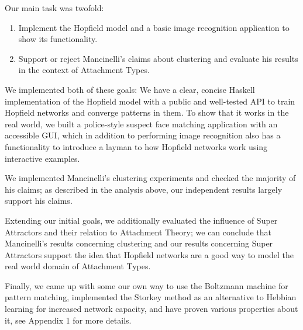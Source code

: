 Our main task was twofold:

\begin{enumerate}
\item Implement the Hopfield model and a basic image recognition application to show its functionality.
\item Support or reject Mancinelli's claims about clustering and evaluate his results in the context of Attachment Types.
\end{enumerate}

We implemented both of these goals: We have a clear, concise Haskell implementation of the Hopfield model with a public and well-tested API to train Hopfield networks and converge patterns in them. To show that it works in the real world, we built a police-style suspect face matching application with an accessible GUI, which in addition to performing image recognition also has a functionality to introduce a layman to how Hopfield networks work using interactive examples.

We implemented Mancinelli's clustering experiments and checked the majority of his claims; as described in the analysis above, our independent results largely support his claims.

Extending our initial goals, we additionally evaluated the influence of Super Attractors and their relation to Attachment Theory; we can conclude that Mancinelli's results concerning clustering and our results concerning Super Attractors support the idea that Hopfield networks are a good way to model the real world domain of Attachment Types.


Finally, we came up with some our own way to use the Boltzmann machine for pattern matching, implemented the Storkey method as an alternative to Hebbian learning for increased network capacity, and have proven various properties about it, see Appendix 1 for more details.
